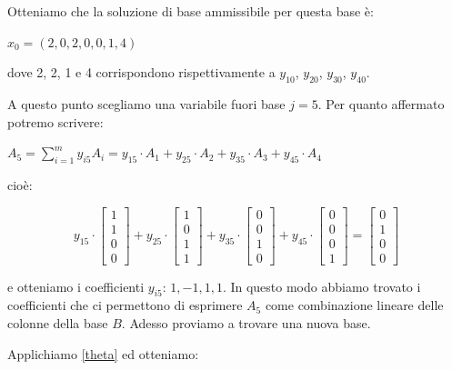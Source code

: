 \documentclass[11pt]{book}
\begin{document}
Otteniamo che la soluzione di base ammissibile per questa base \`e:

\begin{center}
$x_0 = (2, 0, 2, 0, 0, 1, 4)$  
\end{center}

dove 2, 2, 1 e 4 corrispondono rispettivamente a $y_{10}$, $y_{20}$,
$y_{30}$, $y_{40}$.

A questo punto scegliamo una variabile fuori base $j=5$. Per quanto
affermato potremo scrivere:

\begin{center}
$A_5 = \sum\limits_{i=1}^m y_{i5}A_i = y_{15} \cdot A_1 + y_{25} \cdot
  A_2 + y_{35} \cdot A_3 + y_{45} \cdot A_4 $
\end{center}

cio\`e:
\begin{center}
\[
y_{15} \cdot
\begin{bmatrix}
1 \\ 1 \\ 0 \\ 0
\end{bmatrix}
+ y_{25} \cdot
\begin{bmatrix}
1 \\ 0 \\ 1 \\ 1
\end{bmatrix}
+ y_{35} \cdot
\begin{bmatrix}
0 \\ 0 \\ 1 \\ 0
\end{bmatrix}
+ y_{45} \cdot
\begin{bmatrix}
0 \\ 0 \\ 0 \\ 1
\end{bmatrix}
= 
\begin{bmatrix}
0 \\ 1 \\ 0 \\ 0
\end{bmatrix}
\]  
\end{center}

e otteniamo i coefficienti $y_{i5}$: $1, -1, 1, 1$. In questo modo
abbiamo trovato i coefficienti che ci permettono di esprimere $A_5$
come combinazione lineare delle colonne della base $B$. Adesso
proviamo a trovare una nuova base.

Applichiamo \ref{theta} ed otteniamo:
\end{document}
